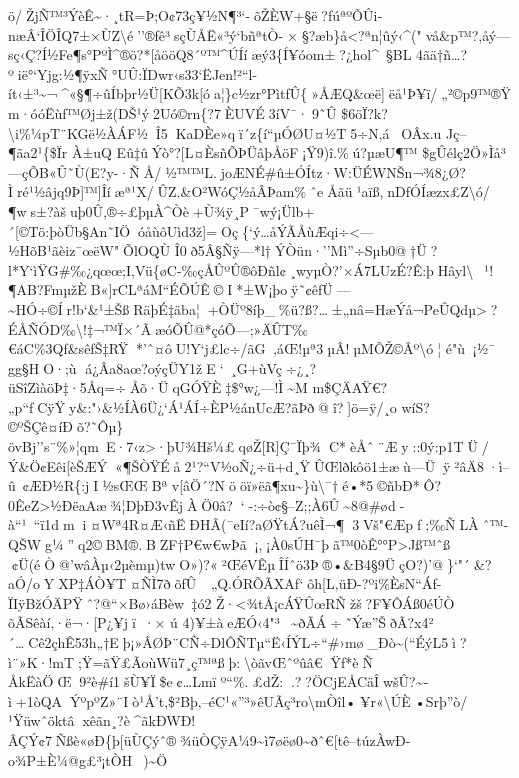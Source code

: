 ö/ŽjÑ™³ÝèÊ\textasciitilde·¸tR=Þ;O¢73ç¥½N¶³`-õŽÈW+§ë?fúªºÕÛi­næÂ`ÎÖÎQ7±×ÙZ\textbackslash é''®fê³sçÙÅË«³ý`bñªtÒ-×§?æb\}å\textless?ªn¦ûý‹\^{}("vå\textbar\&p™?,åý---sç‹Ç\textquotesingle?Í½Fe¶s°PºÌ\^{}®ö?*{[}åööQ8´º™\^{}ÚÍíæý3\{Í¥ó\textbar om±?¿hol\^{}~§BL
4ãä†ñ\ldots?ºië°`Yjg:½¶ÿxÑ\textbar°UÛ:ÏDwr‹s33`ËJen!²``l-ít‹±³\textasciitilde¬\^{}«§¶÷ûÍbþr½Ü{[}KÕ3k{[}óa¦\}c½zr°PìtfÛ\{»ÅÆQ\&œë{]}ëå¹Þ\textbar¥ï/„²©p9™®Ÿm·óóËùƒ™Øj±ž(DŠ¹ý2Uó©rn\{?7ÈUVÉ3íV¯·9˜Û
\$6öÏ?k?\textbackslash i\%¼pT¨\textquotesingle KGë½ÀÁF½Î5KaDÈe»qï´z\textquotesingle\{í``µÓØU¤½T5÷N‚áOÂx.u
J\textquotesingle ç--¶ãa2¹\{\$Ïr À±uQ
Eû‡ûÝò\textbar°?{[}L¤ÈsñÕÞÜâþÅöF¡Ÿ9)î­.\%ú?µæU¶™
\$gÛélç2Ö»Ìå³---çÕB«Û˜Ù(E?y-·ÑÅ/½™™L.joÆNÉ\#û±ÓÍtz·W:ÜÉWNŠ­n¬¾8¿Ø?Ìré¹½âjq9Þ{]}™{]}Îíæª¹X/ÛZ.\&O²WóÇ½åÂÞam\%ˆeÅã­ü¹a\textquotesingle ïß,nDfÓÍæzx£Z\textbackslash ó/¶ws±?àšuþ0Û,®÷£þµÀ\^{}\textquotesingle Òè+Ù¾ÿ¸P¯wý¡Ülb+´{[}©Tö:þòÜb§An˜IÖóåùôUìd3ž{]}=\textquotesingle Oç\{\textquotesingle`ý\ldots åÝÃÅùÆqi÷\textless---½HõB¹ãèiz¯œëW"ÕlOQÙ
Î0ð5Â§Ñÿ---*l†ÝÒün·''Mì''÷Sµb0@†Ü?l*Y`ìŸG\#‰¿qœœ;I,Vü\{øC-‰çÅÛºÛ®ôÐñl¢¸wyµÒ?'×Á7LUzÉ?Ê:þHâyl\textbackslash~¹!¶AB?FmµžÈB«{]}rCLªáM``ÉÕÚÊ©I*±W¡þoÿ˜¢êƒÜ---\textasciitilde HÓ÷©Ír!b`\&¹±ŠßRäþÉ‡äba¦\textquotesingle+ÒÜº8íþ\_\%ü?ß?\ldots±„nâ=HæÝå¬­PeÛQdµ\textgreater?ÉÅÑÓD‰\textbackslash!‡¬™Ï×´ÃæóÕÛ@*çóÕ---;»ÄÛT‰€áC\%3Qƒ\&sêƒŠ‡RŸ*'ˆ¤ôU!Y`j£lc÷/ãG‚áŒ!µª3µÂ!µMÕŽ©Âº\textbackslash ó¦
é"ù¡½¯ gg§HO·;ù
á¿Âa8aœ?oýçÜY1žE`~¸G+ùVç÷¿¸?üSîZìàöÞ‡·5Åq=÷Åõ·ÜqGÓŸÈ‡\$°w¿---!Ì\textasciitilde M
m\$ÇÄAŸ€?„p``ƒCÿŸy\&:"›\&½ÍÀ6\textbar Ü¿`Á¹ÁÍ÷ÈP½ánUcÆ?ãÞð@î?{]}ö=ÿ/¸o
wíS?©ºŠÇê¤íÐõ?˜Ôµ\}övBj''s¨\%»¦qm~E·7‹z\textgreater·þU¾Hš¼£qøŽ{[}R{]}Ç¯Ïþ\textquotesingle¾C*èÅˆ¨Æy: :0ý:p1TÜ/Ý\&Ö¢Eêi{[}èŠÆÝ«¶ŠÒŸÉå2¹?{}``V½oÑ¿÷ü+d¸ŸÛŒlðkôö1±æù---Üÿ²âÄ8·ì--û~¢ÆÐ½R\{:jI½sŒŒBªv{[}âÖ´?Nööï»ëã¶xu\textasciitilde\}ù\textbackslash¯†é•*5©ñbÐ*Ô?0ÊeZ\textgreater½ÐëaAæ¾¦DþÐ3vÊjÀÖ0â?`-:÷ò\textquotesingle¢§--Z;;À6Û\textasciitilde8@\#ød-à``¹~­``ï1dmi¤Wª4R¤Æ‹ñËÐHÂ(¯eIí?aØŸtÁ?uêÌ¬¶3Vš"€Æpƒ   ;‰Ñ LÀˆ™-QŠWg¼''q2©BM®.BZF†P€w€wÞã¡,¡À0sÚH¯þã™0òÊ°°P\textgreater Jß™ˆß
¢Ü(éÒ@'wâÀµ‹2µèmµ)twO»)?«²ŒéVÊµÎÍˆö3Þ®•\&B4§9ÜçO?)'@\}`"´\&?aÓ/oYXP‡ÁÒ¥T­¤ÑÌ7ðõƒÛ~„Q.ÓRÕÃXAf`ôh{[}L‚üÐ-?ºi\%ÈsN``Áf-ÏIÿ BžÓÄPŸˆ?@``×Bø›áBèw~‡­ó2
Ž·\textless¾tÅ¡cÁŸÛœRÑžš?F¥ÔÁß0éÚÒ õÃSêàí‚·ë¬·{[}P¿¥jï·× ú
4)¥±àeÆÓ‹4"³~\textasciitilde ðÃÁ÷˜Ýæ''ŠðÃ?x4²´\ldotsCê2çhÊ53h„†Eþ¡»ÂØÞ¨CÑ÷DlÔÑTµ``Ë‹ÍÝL÷``\#›mø\_Ðò\textasciitilde(``ÉýL5ì?ì¨»K·!mT;Ÿ=ãŸ£ÃoùWü7¸ç™ªßþ:\textbackslash òãvŒˆºûâ€Ÿƒ*èÑ
ÅkËàÖŒ9²è\#í1šÙ¥Ï\$e¢\ldots Lmïº``\%.£dŽ:.??ÖCjEÅCäÎwšÛ?\textasciitilde­ì+1òQAÝºpºZ»¨I\textquotesingleò¹Å't,\$²Bþ‚--éC¹«''³»êUÃç³ro\textbackslash mÒîl•¥r«\textbackslash ÚÈ•S­rþ''ò/¹Ÿ\textbar üwˆöktâxêãn¸?è\^{}ãkÐWÐ!\textbar ÂÇÝ¢7Ñß\textquotesingle è«øÐ\{þ{[}üÙÇýˆ®¾üÒÇÿA¼9\textasciitilde ì7øëø0\textasciitilde ð\textquotesingle ˆ€{[}tê--túzÀwÐ-o¾P±È¼@g£³¡tÒH~)\textasciitilde Ö
